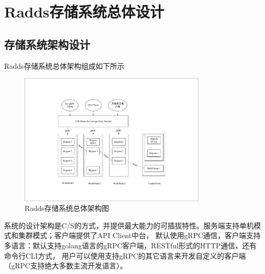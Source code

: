 \section{Radds存储系统总体设计}

	
	
	\subsection{存储系统架构设计}

	Radds存储系统总体架构组成如下所示
	
	\begin{figure}[H]
		\centering
		\includegraphics[width=0.80\textwidth]{pdf/radds_system_arch.pdf}
		\caption{Radds存储系统总体架构图}
		\label{overall_structure}
	\end{figure}

		系统的设计架构是C/S的方式，并提供最大能力的可插拔特性。服务端支持单机模式和集群模式；客户端提供了API Client中台，
		默认使用gRPC通信，客户端支持多语言：默认支持golang语言的gRPC客户端，RESTful形式的HTTP通信，还有命令行CLI方式，
		用户可以使用支持gRPC的其它语言来开发自定义的客户端（gRPC支持绝大多数主流开发语言）。
		
